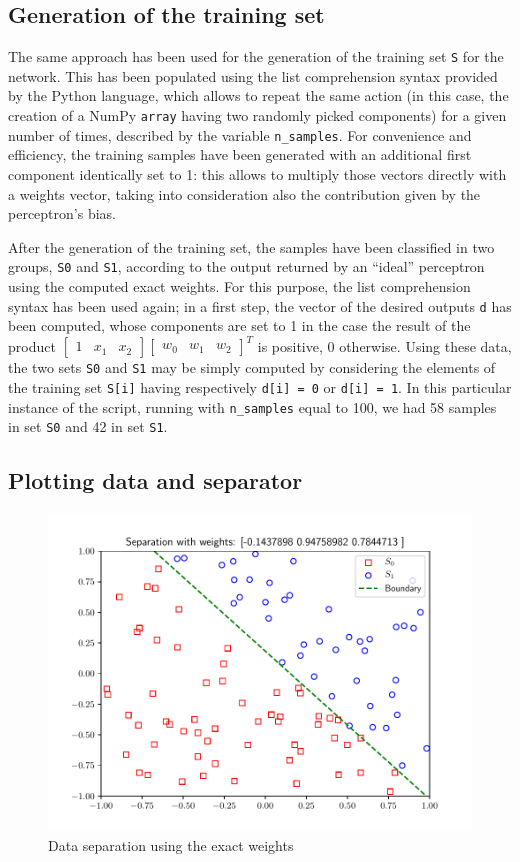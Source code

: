 \documentclass[letterpaper,headings=standardclasses]{scrartcl}
\begin{document}
\subsection{Generation of the training set}

The same approach has been used for the generation of the training set \texttt{S} for the network. This has been populated using the list comprehension syntax provided by the Python language, which allows to repeat the same action (in this case, the creation of a NumPy \texttt{array} having two randomly picked components) for a given number of times, described by the variable \texttt{n\_samples}. For convenience and efficiency, the training samples have been generated with an additional first component identically set to 1: this allows to multiply those vectors directly with a weights vector, taking into consideration also the contribution given by the perceptron's bias.

After the generation of the training set, the samples have been classified in two groups, \texttt{S0} and \texttt{S1}, according to the output returned by an “ideal” perceptron using the computed exact weights. For this purpose, the list comprehension syntax has been used again; in a first step, the vector of the desired outputs \texttt{d} has been computed, whose components are set to 1 in the case the result of the product $[ \begin{matrix}1 & x_1 & x_2 \end{matrix}][\begin{matrix} w_0 & w_1 & w_2 \end{matrix}]^T$ is positive, 0 otherwise. Using these data, the two sets \texttt{S0} and \texttt{S1} may be simply computed by considering the elements of the training set \texttt{S[i]} having respectively \texttt{d[i] = 0} or \texttt{d[i] = 1}. In this particular instance of the script, running with \texttt{n\_samples} equal to 100, we had 58 samples in set \texttt{S0} and 42 in set \texttt{S1}.

\subsection{Plotting data and separator}

\begin{figure}[h]
\centering
\includegraphics[width=.7\linewidth]{exact_sep.pdf}
\caption{Data separation using the exact weights}
\end{figure}
\end{document}
